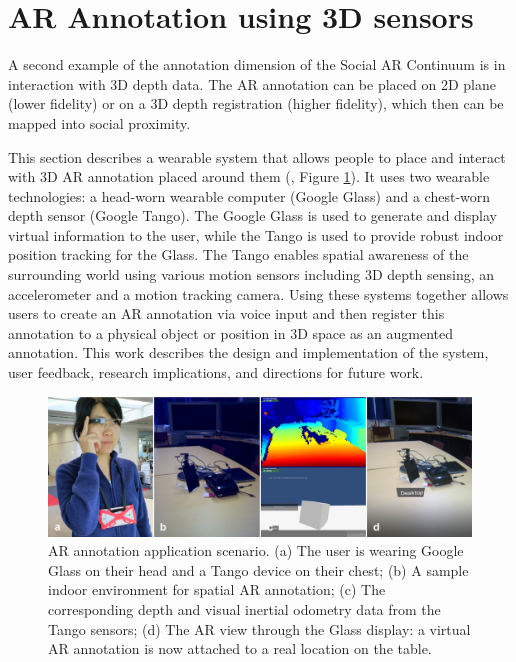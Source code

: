 
\section{AR Annotation using 3D sensors}
\label{sec:3D}

A second example of the annotation dimension of the Social AR Continuum is in interaction with 3D depth data. The AR annotation can be placed on 2D plane (lower fidelity) or on a 3D depth registration (higher fidelity), which then can be mapped into social proximity. 

This section describes a wearable system that allows people to place and interact with 3D AR annotation placed around them (\cite{Nassani2015a, Nassani2015}, Figure \ref{fig:mgia15:teaser}). It uses two wearable technologies: a head-worn wearable computer (Google Glass) and a chest-worn depth sensor (Google Tango). The Google Glass is used to generate and display virtual information to the user, while the Tango is used to provide robust indoor position tracking for the Glass. The Tango enables spatial awareness of the surrounding world using various motion sensors including 3D depth sensing, an accelerometer and a motion tracking camera. Using these systems together allows users to create an AR annotation via voice input and then register this annotation to a physical object or position in 3D space as an augmented annotation. This work describes the design and implementation of the system, user feedback, research implications, and directions for future work.  

\begin{figure}[ht]
  \centering
  \includegraphics[width=\linewidth]{images/mgia15/sampleteaser-01.jpg}
  \caption{AR annotation application scenario. (a) The user is wearing Google Glass on their head and a Tango device on their chest; (b) A sample indoor environment for spatial AR annotation; (c) The corresponding depth and visual inertial odometry data from the Tango sensors; (d) The AR view through the Glass display: a virtual AR annotation is now attached to a real location on the table.}
  \label{fig:mgia15:teaser}
\end{figure}

